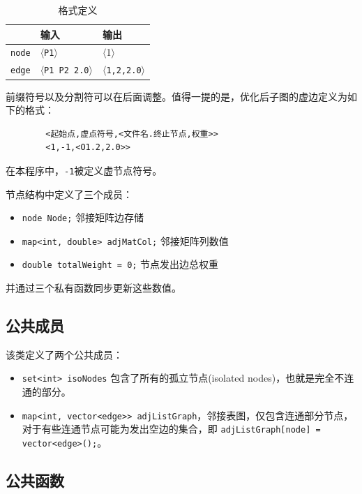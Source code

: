 \documentclass[a4paper,12pt]{article}
\begin{document}
\begin{CJK}{UTF8}{song}
\begin{table}[H]
    \centering
    \caption{格式定义}
    \begin{tabular}{cll}{}
        &输入&输出\\
        \hline
        \texttt{node}&$\langle$\texttt{P1}$\rangle$&$\langle$1$\rangle$\\
        \texttt{edge}&$\langle$\texttt{P1 P2 2.0}$\rangle$&$\langle$\texttt{1,2,2.0}$\rangle$\\
        \hline
    \end{tabular}
\end{table}


前缀符号以及分割符可以在后面调整。值得一提的是，优化后子图的虚边定义为如下的格式：
\begin{center}
    \begin{verbatim}
        <起始点,虚点符号,<文件名.终止节点,权重>>
        <1,-1,<O1.2,2.0>>
        \end{verbatim}
\end{center}
在本程序中，\texttt{-1}被定义虚节点符号。

节点结构中定义了三个成员：
\begin{itemize}
    \item \texttt{node Node;} 邻接矩阵边存储
    \item \texttt{map<int, double> adjMatCol;} 邻接矩阵列数值
    \item \texttt{double totalWeight = 0;} 节点发出边总权重
\end{itemize}

并通过三个私有函数同步更新这些数值。

\subsection{公共成员}

该类定义了两个公共成员：
\begin{itemize}
    \item \texttt{set<int> isoNodes} 包含了所有的孤立节点(isolated nodes)，也就是完全不连通的部分。
    \item \texttt{map<int, vector<edge>> adjListGraph}，邻接表图，仅包含连通部分节点，对于有些连通节点可能为发出空边的集合，即 \texttt{adjListGraph[node] = vector<edge>({});}。
\end{itemize}

\subsection{公共函数}


\end{CJK}
\end{document}
